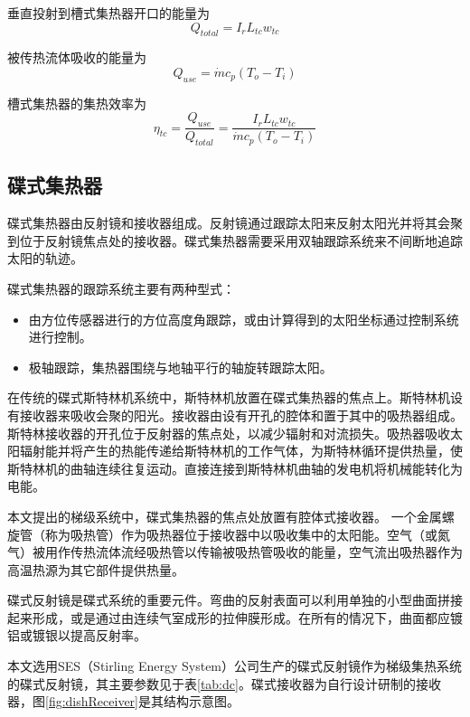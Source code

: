 垂直投射到槽式集热器开口的能量为
\begin{equation}
  Q_{total} = I_r L_{tc} w_{tc}
\end{equation}

被传热流体吸收的能量为
\begin{equation}
  Q_{use} = \dot{m}c_p(T_o - T_i)
\end{equation}

槽式集热器的集热效率为
\begin{equation}
  \eta_{tc} = \dfrac{Q_{use}}{Q_{total}} = 
  \dfrac{I_r L_{tc} w_{tc}}{\dot{m}c_p(T_o - T_i)}
  \label{eq:eta_tc}
\end{equation}

\subsection{碟式集热器}
\label{sec:pdc}

碟式集热器由反射镜和接收器组成。反射镜通过跟踪太阳来反射太阳光并将其会聚到位于反射镜焦点处的接收器。碟式集热器需要采用双轴跟踪系统来不间断地追踪太阳的轨迹。

碟式集热器的跟踪系统主要有两种型式\cite{Adkins1987}：
\begin{itemize}
  \item 由方位传感器进行的方位高度角跟踪，或由计算得到的太阳坐标通过控制系统进行控制。
  \item 极轴跟踪，集热器围绕与地轴平行的轴旋转跟踪太阳。
\end{itemize}

在传统的碟式斯特林机系统中，斯特林机放置在碟式集热器的焦点上。斯特林机设有接收器来吸收会聚的阳光。接收器由设有开孔的腔体和置于其中的吸热器组成。斯特林接收器的开孔位于反射器的焦点处，以减少辐射和对流损失。吸热器吸收太阳辐射能并将产生的热能传递给斯特林机的工作气体，为斯特林循环提供热量，使斯特林机的曲轴连续往复运动。直接连接到斯特林机曲轴的发电机将机械能转化为电能。

本文提出的梯级系统中，碟式集热器的焦点处放置有腔体式接收器。 一个金属螺旋管（称为吸热管）作为吸热器位于接收器中以吸收集中的太阳能。空气（或氮气）被用作传热流体流经吸热管以传输被吸热管吸收的能量，空气流出吸热器作为高温热源为其它部件提供热量。

碟式反射镜是碟式系统的重要元件。弯曲的反射表面可以利用单独的小型曲面拼接起来形成，或是通过由连续气室成形的拉伸膜形成。在所有的情况下，曲面都应镀铝或镀银以提高反射率。

本文选用SES（Stirling Energy System）公司生产的碟式反射镜作为梯级集热系统的碟式反射镜，其主要参数见于表\ref{tab:dc}。碟式接收器为自行设计研制的接收器，图\ref{fig:dishReceiver}是其结构示意图。

